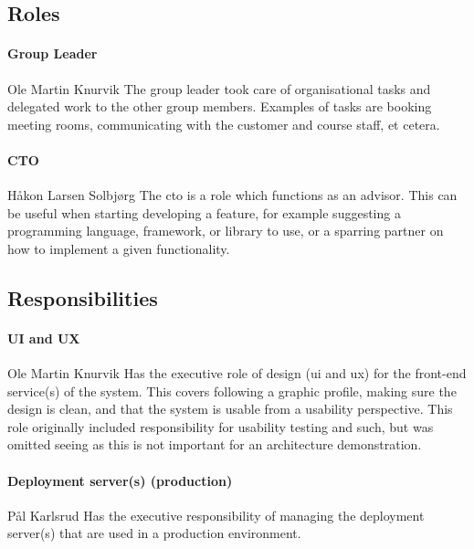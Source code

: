 \subsection{Roles}
  
\paragraph{Group Leader} Ole Martin Knurvik\newline
The group leader took care of organisational tasks and delegated work to the other group members. Examples of tasks are booking meeting rooms, communicating with the customer and course staff, et cetera.
  
\paragraph{CTO} Håkon Larsen Solbjørg\newline
The \acrlong{cto} is a role which functions as an advisor. This can be useful when starting developing a feature, for example suggesting a programming language, framework, or library to use, or a sparring partner on how to implement a given functionality.


\subsection{Responsibilities}

\paragraph{UI and UX} Ole Martin Knurvik\newline
Has the executive role of design (\acrshort{ui} and \acrshort{ux}) for the front-end service(s) of the system. This covers following a graphic profile, making sure the design is clean, and that the system is usable from a usability perspective. This role originally included responsibility for usability testing and such, but was omitted seeing as this is not important for an architecture demonstration.

\paragraph{Deployment server(s) (production)} Pål Karlsrud\newline
Has the executive responsibility of managing the deployment server(s) that are used in a production environment.

